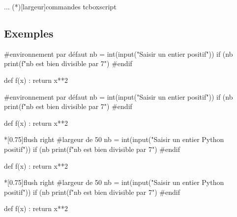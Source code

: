 \documentclass[a4paper,french,11pt]{article}
\begin{document}
\begin{codetex}
\usepackage{scontents} %
...
\CodePythonLstFichier(*)[largeur]{commandes tcbox}{script}
\end{codetex}

\subsection{Exemples}

\begin{codetex}
\begin{CodePythonLst}{} %
#environnement par défaut
nb = int(input("Saisir un entier positif"))
if (nb %
	print(f"{nb} est bien divisible par 7")
#endif

def f(x) :
	return x**2
\end{CodePythonLst}
\end{codetex}

\begin{codesortie}
\begin{CodePythonLst}{}
#environnement par défaut
nb = int(input("Saisir un entier positif"))
if (nb %
	print(f"{nb} est bien divisible par 7")
#endif

def f(x) :
	return x**2
\end{CodePythonLst}
\end{codesortie}

\begin{codetex}
\begin{CodePythonLstAlt}*[0.75\linewidth]{flush right}
#largeur de 50%
nb = int(input("Saisir un entier Python positif"))
if (nb %
	print(f"{nb} est bien divisible par 7")
#endif

def f(x) :
	return x**2
\end{CodePythonLstAlt}
\end{codetex}

\begin{codesortie}
\begin{CodePythonLstAlt}*[0.75\linewidth]{flush right}
#largeur de 50%
nb = int(input("Saisir un entier Python positif"))
if (nb %
	print(f"{nb} est bien divisible par 7")
#endif

def f(x) :
	return x**2
\end{CodePythonLstAlt}
\end{codesortie}
\end{document}
